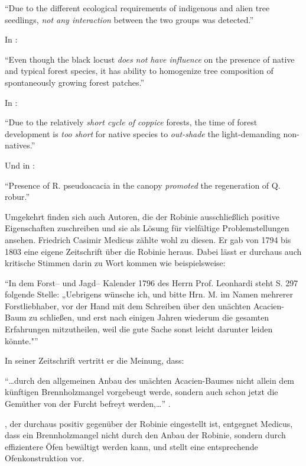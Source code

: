 \documentclass[twocolumn]{scrartcl}
\begin{document}
\enquote{Due to the different ecological requirements of indigenous
  and alien tree seedlings, \emph{not any interaction} between the two
  groups was detected.}

In \citet{petrasova2013neophyten}:

\enquote{Even though the black locust \emph{does not have influence}
  on the presence of native and typical forest species, it has ability
  to homogenize tree composition of spontaneously growing forest
  patches.}

In \citet{radtke2013robinieNiederwald}:

\enquote{Due to the relatively \emph{short cycle of coppice} forests,
  the time of forest development is \emph{too short} for native
  species to \emph{out-shade} the light-demanding non-natives.}

Und in \citet{terwei2013nonNative}:

\enquote{Presence of R. pseudoacacia in the canopy \emph{promoted} the
  regeneration of Q. robur.}

Umgekehrt finden sich auch Autoren, die der Robinie ausschließlich
positive Eigenschaften zuschreiben und sie als Lösung für vielfältige
Problemstellungen ansehen. Friedrich Casimir Medicus zählte wohl zu
diesen. Er gab von 1794 bis 1803 eine eigene Zeitschrift über die
Robinie heraus. Dabei lässt er durchaus auch kritische Stimmen darin
zu Wort kommen wie beispielsweise:

\enquote{In dem Forst-- und Jagd-- Kalender 1796 des Herrn
  Prof. Leonhardi steht S. 297 folgende Stelle: „Uebrigens wünsche
  ich, und bitte Hrn. M. im Namen mehrerer Forstliebhaber, vor der
  Hand mit dem Schreiben über den unächten Acacien-Baum zu schließen,
  und erst nach einigen Jahren wiederum die gesamten Erfahrungen
  mitzutheilen, weil die gute Sache sonst leicht darunter leiden
  könnte."} \citep[Bd. 2, Nr. 2, S. 3]{medicus1794ffRobinie}

In seiner Zeitschrift vertritt er die Meinung, dass:

\enquote{\dots durch den allgemeinen Anbau des unächten Acacien-Baumes
  nicht allein dem künftigen Brennholzmangel vorgebeugt werde, sondern
  auch schon jetzt die Gemüther von der Furcht befreyt werden,\dots}
\citep[Bd. 1, Nr. 3, S. 186]{medicus1794ffRobinie}.

\citet{hartig1798robinie}, der durchaus positiv gegenüber der Robinie
eingestellt ist, entgegnet Medicus, dass ein Brennholzmangel nicht
durch den Anbau der Robinie, sondern durch effizientere Öfen bewältigt
werden kann, und stellt eine entsprechende Ofenkonstruktion vor.
\end{document}
